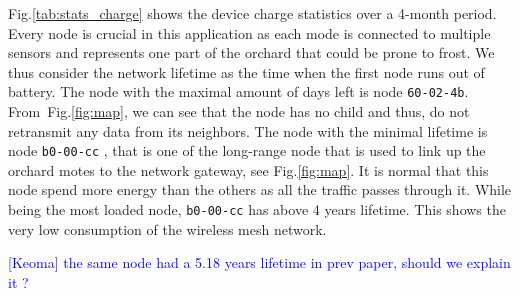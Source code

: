 \documentclass{sig-alternate}
\newcommand{\keoma}[1]       {\textcolor{blue}{[Keoma] #1}}
\begin{document}
Fig.\ref{tab:stats_charge} shows the device charge statistics over a 4-month period.
Every node is crucial in this application as each mode is connected to multiple sensors and represents one part of the orchard that could be prone to frost.
We thus consider the network lifetime as the time when the first node runs out of battery.
The node with the maximal amount of days left is node {\tt 60-02-4b}.
From~Fig.\ref{fig:map}, we can see that the node has no child and thus, do not retransmit any data from its neighbors.
The node with the minimal lifetime is node {\tt b0-00-cc} , that is one of the long-range node that is used to link up the orchard motes to the network gateway, see Fig.\ref{fig:map}.
It is normal that this node spend more energy than the others as all the traffic passes through it.
While being the most loaded node, {\tt b0-00-cc} has above 4 years lifetime.
This shows the very low consumption of the wireless mesh network.

\keoma{the same node had a 5.18 years lifetime in prev paper, should we explain it ?}
\end{document}
